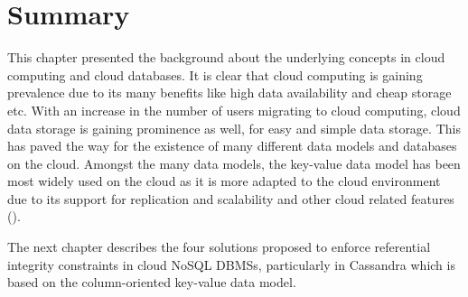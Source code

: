 











\section{Summary}



This chapter presented the background about the underlying concepts in cloud
computing and cloud databases.  It is clear that cloud computing is gaining
prevalence due to its many benefits like high data availability and cheap
storage etc.  With an increase in the number of users
migrating to cloud computing,   cloud data storage is gaining prominence as well,  
for easy and simple data storage.  This has paved the way for the existence
of many different data models and databases on the cloud.  Amongst the many data
models,   the key-value data model has been  most widely used  on the cloud
as it is more adapted to the cloud environment due to its support for
replication and scalability and other cloud related features (). 



The next chapter describes the four solutions proposed to enforce referential
integrity constraints in cloud \ac{NoSQL} \acp{DBMS},   particularly in
Cassandra which is based on the column-oriented key-value data model. 





